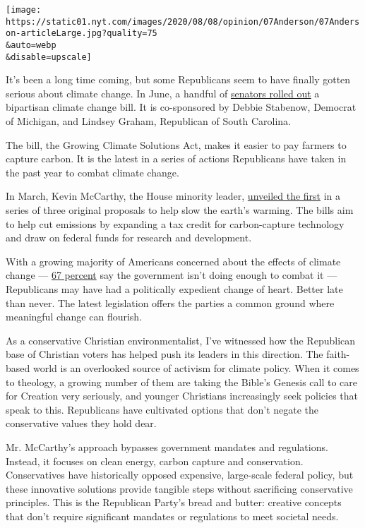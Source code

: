 \texttt{[image: https://static01.nyt.com/images/2020/08/08/opinion/07Anderson/07Anderson-articleLarge.jpg?quality=75\\\&auto=webp\\\&disable=upscale]}

It's been a long time coming, but some Republicans seem to have finally
gotten serious about climate change. In June, a handful of
\href{https://www.politico.com/newsletters/the-long-game/2020/08/04/betting-the-farm-489964}{senators
rolled out} a bipartisan climate change bill. It is co-sponsored by
Debbie Stabenow, Democrat of Michigan, and Lindsey Graham, Republican of
South Carolina.

The bill, the Growing Climate Solutions Act, makes it easier to pay
farmers to capture carbon. It is the latest in a series of actions
Republicans have taken in the past year to combat climate change.

In March, Kevin McCarthy, the House minority leader,
\href{https://www.politico.com/news/2020/02/13/gop-climate-change-kevin-mccarthy-115025}{unveiled
the first} in a series of three original proposals to help slow the
earth's warming. The bills aim to help cut emissions by expanding a tax
credit for carbon-capture technology and draw on federal funds for
research and development.

With a growing majority of Americans concerned about the effects of
climate change ---
\href{https://www.pewresearch.org/fact-tank/2020/04/21/how-americans-see-climate-change-and-the-environment-in-7-charts/}{67
percent} say the government isn't doing enough to combat it ---
Republicans may have had a politically expedient change of heart. Better
late than never. The latest legislation offers the parties a common
ground where meaningful change can flourish.

As a conservative Christian environmentalist, I've witnessed how the
Republican base of Christian voters has helped push its leaders in this
direction. The faith-based world is an overlooked source of activism for
climate policy. When it comes to theology, a growing number of them are
taking the Bible's Genesis call to care for Creation very seriously, and
younger Christians increasingly seek policies that speak to this.
Republicans have cultivated options that don't negate the conservative
values they hold dear.

Mr. McCarthy's approach bypasses government mandates and regulations.
Instead, it focuses on clean energy, carbon capture and conservation.
Conservatives have historically opposed expensive, large-scale federal
policy, but these innovative solutions provide tangible steps without
sacrificing conservative principles. This is the Republican Party's
bread and butter: creative concepts that don't require significant
mandates or regulations to meet societal needs.

